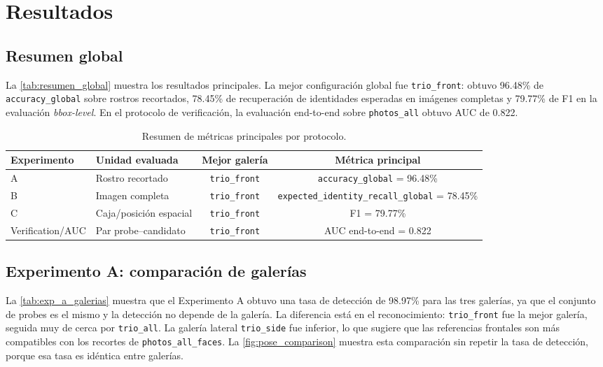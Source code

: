 \documentclass[11pt]{article}
\newcommand{\accglobal}{\texttt{accuracy\_global}}
\begin{document}
\section{Resultados}
\label{sec:resultados}

\subsection{Resumen global}

La \autoref{tab:resumen_global} muestra los resultados principales. La mejor configuraci\'on global fue \texttt{trio\_front}: obtuvo 96.48\% de \accglobal{} sobre rostros recortados, 78.45\% de recuperaci\'on de identidades esperadas en im\'agenes completas y 79.77\% de F1 en la evaluaci\'on \textit{bbox-level}. En el protocolo de verificaci\'on, la evaluaci\'on end-to-end sobre \texttt{photos\_all} obtuvo AUC de 0.822.

\begin{table}[H]
\centering
\caption{Resumen de m\'etricas principales por protocolo.}
\label{tab:resumen_global}
\begin{adjustbox}{max width=\textwidth}
\begin{tabular}{llcc}
\toprule
Experimento & Unidad evaluada & Mejor galer\'ia & M\'etrica principal \\
\midrule
A & Rostro recortado & \texttt{trio\_front} & \accglobal{} = 96.48\% \\
B & Imagen completa & \texttt{trio\_front} & \texttt{expected\_identity\_recall\_global} = 78.45\% \\
C & Caja/posici\'on espacial & \texttt{trio\_front} & F1 = 79.77\% \\
Verification/AUC & Par probe--candidato & \texttt{trio\_front} & AUC end-to-end = 0.822 \\
\bottomrule
\end{tabular}
\end{adjustbox}
\end{table}

\subsection{Experimento A: comparaci\'on de galer\'ias}

La \autoref{tab:exp_a_galerias} muestra que el Experimento A obtuvo una tasa de detecci\'on de 98.97\% para las tres galer\'ias, ya que el conjunto de probes es el mismo y la detecci\'on no depende de la galer\'ia. La diferencia est\'a en el reconocimiento: \texttt{trio\_front} fue la mejor galer\'ia, seguida muy de cerca por \texttt{trio\_all}. La galer\'ia lateral \texttt{trio\_side} fue inferior, lo que sugiere que las referencias frontales son m\'as compatibles con los recortes de \texttt{photos\_all\_faces}. La \autoref{fig:pose_comparison} muestra esta comparaci\'on sin repetir la tasa de detecci\'on, porque esa tasa es id\'entica entre galer\'ias.
\end{document}

